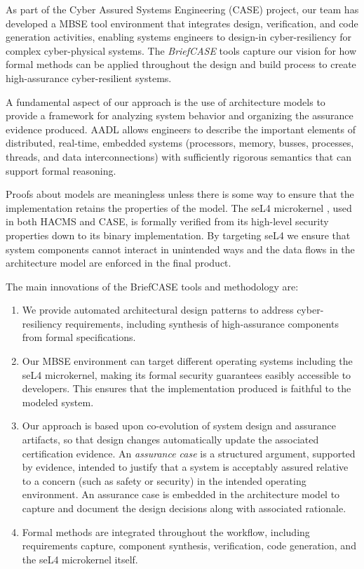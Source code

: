 As part of the Cyber Assured Systems Engineering (CASE) project,
our team has developed a MBSE tool environment that integrates design, verification,
and code generation activities, enabling systems engineers to design-in cyber-resiliency
for complex cyber-physical systems. The {\em BriefCASE} tools capture our 
vision for how formal methods can be applied throughout the design and build process 
to create high-assurance cyber-resilient systems.  

A fundamental aspect of our approach is the use of 
architecture models to provide a framework for analyzing
system behavior and organizing the assurance evidence produced.  
AADL allows engineers to describe the important elements of distributed,
real-time, embedded systems (processors, memory, busses, processes, 
threads, and data interconnections) with sufficiently rigorous semantics
that can support formal reasoning.  

Proofs about models are meaningless unless there is some way to ensure
that the implementation retains the properties of the model.  The seL4 
microkernel \cite{sel4-sosp09}, used in both HACMS and CASE, is
formally verified from its high-level security properties down to its binary implementation.  
By targeting seL4 we ensure that system components cannot interact in unintended 
ways and the data flows in the architecture model are enforced in the
final product.  

The main innovations of the BriefCASE tools and methodology are:

\begin{enumerate}

\item We provide automated architectural design patterns to address cyber-resiliency requirements, 
including synthesis of high-assurance components from formal specifications.

\item Our MBSE environment can target different operating systems including the seL4 microkernel, 
making its formal security guarantees easibly accessible to developers. This ensures that 
the implementation produced is faithful to the modeled system. 

\item Our approach is based upon co-evolution of system design and assurance artifacts, so that
design changes automatically update the associated certification evidence. An {\em assurance case}
is a structured argument, supported by evidence, intended to justify that a system is acceptably assured 
relative to a concern (such as safety or security) in the intended operating environment.
An assurance case is embedded in the architecture model to capture and document the design decisions 
along with associated rationale.

\item Formal methods are integrated throughout the workflow, including requirements capture,
component synthesis, verification, code generation, and the seL4 microkernel itself. 

\end{enumerate}




